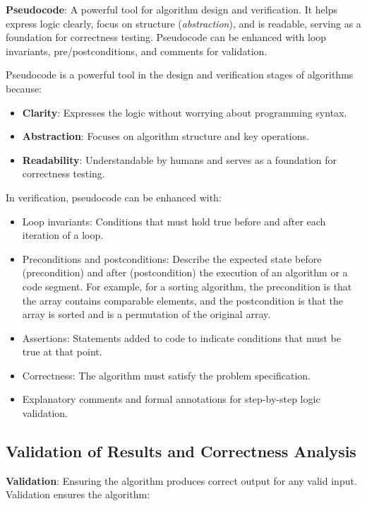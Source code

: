 \documentclass[12pt]{article}
\begin{document}
\textbf{Pseudocode}: A powerful tool for algorithm design and verification. It helps express logic clearly, focus on structure (\textit{abstraction}), and is readable, serving as a foundation for correctness testing. Pseudocode can be enhanced with loop invariants, pre/postconditions, and comments for validation.

\vspace{2mm}

Pseudocode is a powerful tool in the design and verification stages of algorithms because:

\begin{itemize}
    \item \textbf{Clarity}: Expresses the logic without worrying about programming syntax.
    \item \textbf{Abstraction}: Focuses on algorithm structure and key operations.
    \item \textbf{Readability}: Understandable by humans and serves as a foundation for correctness testing.
\end{itemize}

In verification, pseudocode can be enhanced with:

\begin{itemize}
    \item Loop invariants: Conditions that must hold true before and after each iteration of a loop.
    \item Preconditions and postconditions: Describe the expected state before (precondition) and after (postcondition) the execution of an algorithm or a code segment. For example, for a sorting algorithm, the precondition is that the array contains comparable elements, and the postcondition is that the array is sorted and is a permutation of the original array.
    \item Assertions: Statements added to code to indicate conditions that must be true at that point.
    \item Correctness: The algorithm must satisfy the problem specification.
    \item Explanatory comments and formal annotations for step-by-step logic validation.
\end{itemize}

\subsection{Validation of Results and Correctness Analysis}
\textbf{Validation}: Ensuring the algorithm produces correct output for any valid input.  Validation ensures the algorithm:
\end{document}
